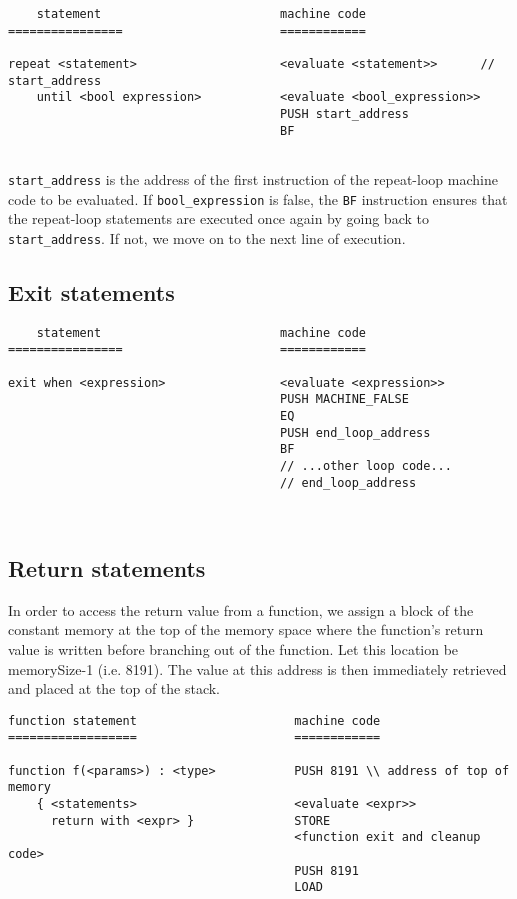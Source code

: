 \documentclass[11pt]{article}
\begin{document}
\begin{verbatim}
    statement                         machine code
================                      ============

repeat <statement>                    <evaluate <statement>>      // start_address
    until <bool expression>           <evaluate <bool_expression>>
                                      PUSH start_address
                                      BF


\end{verbatim}

\texttt{start\_address} is the address of the first instruction of the repeat-loop machine code to be evaluated. If \texttt{bool\_expression} is false, the \texttt{BF} instruction ensures that the repeat-loop statements are executed once again by going back to \texttt{start\_address}. If not, we move on to the next line of execution.

\subsection{Exit statements}

\begin{verbatim}
    statement                         machine code
================                      ============

exit when <expression>                <evaluate <expression>>
                                      PUSH MACHINE_FALSE
                                      EQ
                                      PUSH end_loop_address
                                      BF
                                      // ...other loop code...
                                      // end_loop_address



\end{verbatim}

\subsection{Return statements}

In order to access the return value from a function, we assign a block of the constant memory at the top of the memory space where the function's return value is written before branching out of the function. Let this location be memorySize-1 (i.e. 8191). The value at this address is then immediately retrieved and placed at the top of the stack.

\begin{verbatim}
function statement                      machine code
==================                      ============

function f(<params>) : <type>           PUSH 8191 \\ address of top of memory
    { <statements>                      <evaluate <expr>>
      return with <expr> }              STORE
                                        <function exit and cleanup code>
                                        PUSH 8191
                                        LOAD
\end{verbatim}
\end{document}
